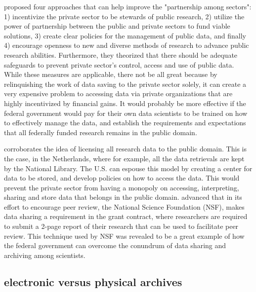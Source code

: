 \documentclass[sigconf]{acmart}
\begin{document}
\cite{berman2013will} proposed four approaches that can help improve the "partnership among sectors": 1) incentivize the private sector to be stewards of public research, 2) utilize the power of partnership between the public and private sectors to fund viable solutions, 3) create clear policies for the management of public data, and finally 4) encourage openness to new and diverse methods of research to advance public research abilities. Furthermore, they theorized that there should be adequate safeguards to prevent private sector’s control, access and use of public data. While these measures are applicable, there not be all great because by relinquishing the work of data saving to the private sector solely, it can create a very expensive problem to accessing data via private organizations that are highly incentivized by financial gains. It would probably be more effective if the federal government would pay for their own data scientists to be trained on how to effectively manage the data, and establish the requirements and expectations that all federally funded research remains in the public domain. 


\cite{sarkol2016scientific} corroborates the idea of licensing all research data to the public domain. This is the case, in the Netherlands, where for example, all the data retrievals are kept by the National Library. The U.S. can espouse this model by creating a center for data to be stored, and develop policies on how to access the data. This would prevent the private sector from having a monopoly on accessing, interpreting, sharing and store data that belongs in the public domain.  \cite{borgman2012conundrum} advanced that in its effort to encourage peer review, the National Science Foundation (NSF), makes data sharing a requirement in the grant contract, where researchers are required to submit a 2-page report of their research that can be used to facilitate peer review. This technique used by NSF was revealed to be a great example of how the federal government can overcome the conundrum of data sharing and archiving among scientists.


\subsection{electronic versus physical archives}
\end{document}
